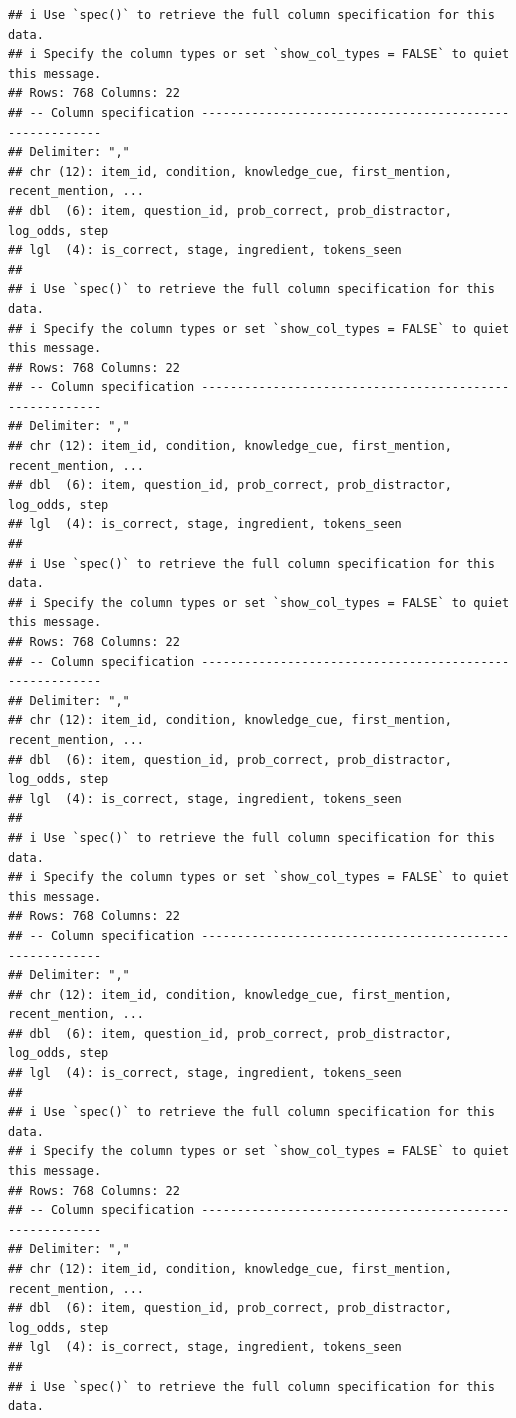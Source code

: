 \documentclass[
]{article}
\begin{document}
\begin{verbatim}
## i Use `spec()` to retrieve the full column specification for this data.
## i Specify the column types or set `show_col_types = FALSE` to quiet this message.
## Rows: 768 Columns: 22
## -- Column specification --------------------------------------------------------
## Delimiter: ","
## chr (12): item_id, condition, knowledge_cue, first_mention, recent_mention, ...
## dbl  (6): item, question_id, prob_correct, prob_distractor, log_odds, step
## lgl  (4): is_correct, stage, ingredient, tokens_seen
## 
## i Use `spec()` to retrieve the full column specification for this data.
## i Specify the column types or set `show_col_types = FALSE` to quiet this message.
## Rows: 768 Columns: 22
## -- Column specification --------------------------------------------------------
## Delimiter: ","
## chr (12): item_id, condition, knowledge_cue, first_mention, recent_mention, ...
## dbl  (6): item, question_id, prob_correct, prob_distractor, log_odds, step
## lgl  (4): is_correct, stage, ingredient, tokens_seen
## 
## i Use `spec()` to retrieve the full column specification for this data.
## i Specify the column types or set `show_col_types = FALSE` to quiet this message.
## Rows: 768 Columns: 22
## -- Column specification --------------------------------------------------------
## Delimiter: ","
## chr (12): item_id, condition, knowledge_cue, first_mention, recent_mention, ...
## dbl  (6): item, question_id, prob_correct, prob_distractor, log_odds, step
## lgl  (4): is_correct, stage, ingredient, tokens_seen
## 
## i Use `spec()` to retrieve the full column specification for this data.
## i Specify the column types or set `show_col_types = FALSE` to quiet this message.
## Rows: 768 Columns: 22
## -- Column specification --------------------------------------------------------
## Delimiter: ","
## chr (12): item_id, condition, knowledge_cue, first_mention, recent_mention, ...
## dbl  (6): item, question_id, prob_correct, prob_distractor, log_odds, step
## lgl  (4): is_correct, stage, ingredient, tokens_seen
## 
## i Use `spec()` to retrieve the full column specification for this data.
## i Specify the column types or set `show_col_types = FALSE` to quiet this message.
## Rows: 768 Columns: 22
## -- Column specification --------------------------------------------------------
## Delimiter: ","
## chr (12): item_id, condition, knowledge_cue, first_mention, recent_mention, ...
## dbl  (6): item, question_id, prob_correct, prob_distractor, log_odds, step
## lgl  (4): is_correct, stage, ingredient, tokens_seen
## 
## i Use `spec()` to retrieve the full column specification for this data.

\end{verbatim}
\end{document}
